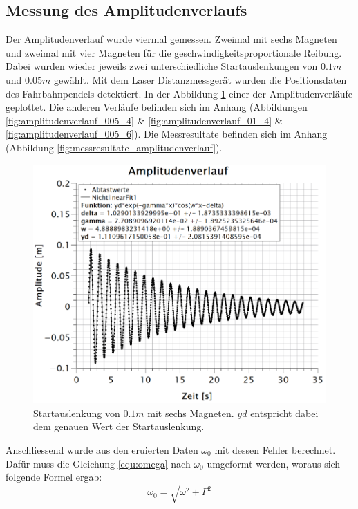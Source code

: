 \subsection{Messung des Amplitudenverlaufs}
\label{subsec:amplitudenverlauf}
Der Amplitudenverlauf wurde viermal gemessen. Zweimal mit sechs Magneten und zweimal mit vier Magneten für die geschwindigkeitsproportionale Reibung. Dabei wurden wieder jeweils zwei unterschiedliche Startauslenkungen von $0.1m$ und $0.05m$ gewählt. Mit dem Laser Distanzmessgerät wurden die Positionsdaten des Fahrbahnpendels detektiert. In der Abbildung \ref{fig:amplitudenverlauf_01_6} einer der Amplitudenverläufe geplottet. Die anderen Verläufe befinden sich im Anhang (Abbildungen \ref{fig:amplitudenverlauf_005_4} \& \ref{fig:amplitudenverlauf_01_4} \& \ref{fig:amplitudenverlauf_005_6}). Die Messresultate befinden sich im Anhang (Abbildung \ref{fig:messresultate_amplitudenverlauf}).
\begin{figure}[H]
\centering
\includegraphics[scale=1.1]{Bilder/amplitudenverlauf_01_6.png} 
\caption{Startauslenkung von $0.1m$ mit sechs Magneten. $yd$ entspricht dabei dem \glqq genauen\grqq\: Wert der Startauslenkung.}
\label{fig:amplitudenverlauf_01_6}
\end{figure}
Anschliessend wurde aus den eruierten Daten $\omega_{0}$ mit dessen Fehler berechnet. Dafür muss die Gleichung \ref{equ:omega} nach $\omega_{0}$ umgeformt werden, woraus sich folgende Formel ergab:
\begin{equation}
\omega_{0}=\sqrt{\omega^{2}+\Gamma^{2}}
\label{equ:omega_0}
\end{equation}

